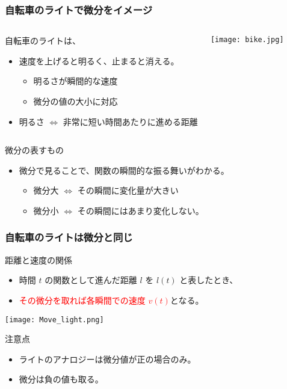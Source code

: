 \documentclass[12pt, dvipdfmx]{beamer}
\begin{document}
\begin{frame}
	\frametitle{自転車のライトで微分をイメージ}
		\begin{columns}[T, onlytextwidth]
				\begin{block}{自転車のライトは、}
					\begin{itemize}
						\item 速度を上げると明るく、止まると消える。
						\begin{itemize}
							\item 明るさが瞬間的な速度
							\item 微分の値の大小に対応
						\end{itemize}
						\item \alert{明るさ $\Leftrightarrow$ 非常に短い時間あたりに進める距離}
					\end{itemize}
				\end{block}
				\begin{center}
					\texttt{[image: bike.jpg]}
				\end{center}
		\end{columns}
		\begin{alertblock}{微分の表すもの}
			\begin{itemize}
				\item 微分で見ることで、関数の瞬間的な振る舞いがわかる。
				\begin{itemize}
					\item 微分大 $\Leftrightarrow$ その瞬間に変化量が大きい
					\item 微分小 $\Leftrightarrow$ その瞬間にはあまり変化しない。
				\end{itemize}
			\end{itemize}
		\end{alertblock}
\end{frame}

\begin{frame}
	\frametitle{自転車のライトは微分と同じ}
	\begin{block}{距離と速度の関係}
		\begin{itemize}
			\item 時間 $t$ の関数として進んだ距離 $l$ を $l(t)$ と表したとき、
			\item \textcolor{red}{その微分を取れば各瞬間での速度 $v(t)$}となる。
		\end{itemize}
	\end{block}
		\begin{center}
			\texttt{[image: Move\_light.png]}
		\end{center}
	\begin{alertblock}{注意点}
		\begin{itemize}
			\item ライトのアナロジーは微分値が正の場合のみ。
			\item 微分は負の値も取る。
		\end{itemize}
	\end{alertblock}
\end{frame}
\end{document}
